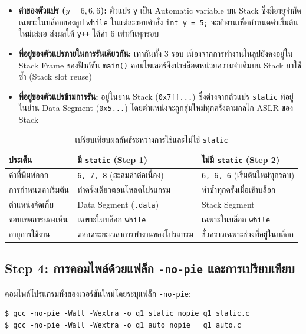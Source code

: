 \documentclass[a4paper,11pt]{article}
\newcommand{\code}[1]{\texttt{#1}}
\begin{document}
\begin{itemize}[leftmargin=*]
  \item \textbf{ค่าของตัวแปร ($y = 6, 6, 6$):} ตัวแปร \code{y} เป็น Automatic variable บน Stack ซึ่งมีอายุจำกัดเฉพาะในบล็อกของลูป \code{while} ในแต่ละรอบคำสั่ง \code{int y = 5;} จะทำงานเพื่อกำหนดค่าเริ่มต้นใหม่เสมอ ส่งผลให้ \code{y++} ได้ค่า $6$ เท่ากันทุกรอบ
  \item \textbf{ที่อยู่ของตัวแปรภายในการรันเดียวกัน:} เท่ากันทั้ง 3 รอบ เนื่องจากการทำงานในลูปยังคงอยู่ใน Stack Frame ของฟังก์ชัน \code{main()} คอมไพเลอร์จึงนำสล็อตหน่วยความจำเดิมบน Stack มาใช้ซ้ำ (Stack slot reuse)
  \item \textbf{ที่อยู่ของตัวแปรข้ามการรัน:} อยู่ในย่าน Stack (\code{0x7ff...}) ซึ่งต่างจากตัวแปร \code{static} ที่อยู่ในย่าน Data Segment (\code{0x5...}) โดยตำแหน่งจะถูกสุ่มใหม่ทุกครั้งตามกลไก ASLR ของ Stack
\end{itemize}

\begin{table}[H]
\centering\small
\caption{เปรียบเทียบผลลัพธ์ระหว่างการใช้และไม่ใช้ \code{static}}
\begin{tabular}{p{3.5cm}p{5.2cm}p{5.2cm}}
\toprule
\textbf{ประเด็น} & \textbf{มี \code{static} (Step 1)} & \textbf{ไม่มี \code{static} (Step 2)} \\
\midrule
ค่าที่พิมพ์ออก & \code{6, 7, 8} (สะสมค่าต่อเนื่อง) & \code{6, 6, 6} (เริ่มต้นใหม่ทุกรอบ) \\
การกำหนดค่าเริ่มต้น & ทำครั้งเดียวตอนโหลดโปรแกรม & ทำซ้ำทุกครั้งเมื่อเข้าบล็อก \\
ตำแหน่งจัดเก็บ & Data Segment (\code{.data}) & Stack Segment \\
ขอบเขตการมองเห็น & เฉพาะในบล็อก \code{while} & เฉพาะในบล็อก \code{while} \\
อายุการใช้งาน & ตลอดระยะเวลาการทำงานของโปรแกรม & ชั่วคราวเฉพาะช่วงที่อยู่ในบล็อก \\
\bottomrule
\end{tabular}
\end{table}

\subsection{Step 4: การคอมไพล์ด้วยแฟล็ก \code{-no-pie} และการเปรียบเทียบ}

คอมไพล์โปรแกรมทั้งสองเวอร์ชันใหม่โดยระบุแฟล็ก \code{-no-pie}:
\begin{lstlisting}[style=terminal]
$ gcc -no-pie -Wall -Wextra -o q1_static_nopie q1_static.c
$ gcc -no-pie -Wall -Wextra -o q1_auto_nopie   q1_auto.c
\end{lstlisting}
\end{document}
